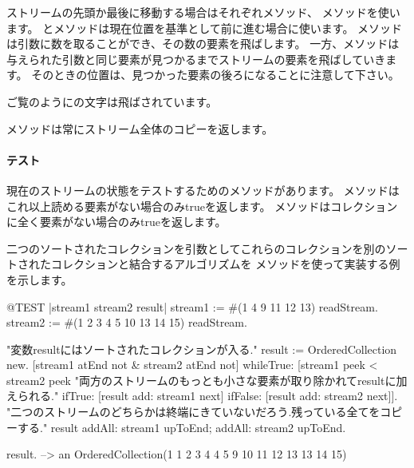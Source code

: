 \documentclass[a4paper,10pt,twoside]{book}
\begin{document}
ストリームの先頭か最後に移動する場合はそれぞれメソッド、
メソッドを使います。
とメソッドは現在位置を基準として前に進む場合に使います。
メソッドは引数に数を取ることができ、その数の要素を飛ばします。
一方、メソッドは与えられた引数と同じ要素が見つかるまでストリームの要素を飛ばしていきます。
そのときの位置は、見つかった要素の後ろになることに注意して下さい。


ご覧のようにの文字は飛ばされています。

メソッドは常にストリーム全体のコピーを返します。

\paragraph{テスト}現在のストリームの状態をテストするためのメソッドがあります。
メソッドはこれ以上読める要素がない場合のみtrueを返します。
メソッドはコレクションに全く要素がない場合のみtrueを返します。

二つのソートされたコレクションを引数としてこれらのコレクションを別のソートされたコレクションと結合するアルゴリズムを
メソッドを使って実装する例を示します。

\begin{code}{@TEST |stream1 stream2 result|}
stream1 := #(1 4 9 11 12 13) readStream.
stream2 := #(1 2 3 4 5 10 13 14 15) readStream.

"変数resultにはソートされたコレクションが入る."
result := OrderedCollection new.
[stream1 atEnd not & stream2 atEnd not]
  whileTrue: [stream1 peek < stream2 peek
    "両方のストリームのもっとも小さな要素が取り除かれてresultに加えられる."
    ifTrue: [result add: stream1 next]
    ifFalse: [result add: stream2 next]].
"二つのストリームのどちらかは終端にきていないだろう.残っている全てをコピーする."
result
  addAll: stream1 upToEnd;
  addAll: stream2 upToEnd.

result. -->   an OrderedCollection(1 1 2 3 4 4 5 9 10 11 12 13 13 14 15)
\end{code}
\end{document}
